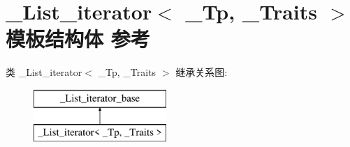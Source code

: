 \hypertarget{struct___list__iterator}{}\section{\+\_\+\+List\+\_\+iterator$<$ \+\_\+\+Tp, \+\_\+\+Traits $>$ 模板结构体 参考}
\label{struct___list__iterator}
类 \+\_\+\+List\+\_\+iterator$<$ \+\_\+\+Tp, \+\_\+\+Traits $>$ 继承关系图\+:\begin{figure}[H]
\begin{center}
\leavevmode
\includegraphics[height=2.000000cm]{struct___list__iterator}
\end{center}
\end{figure}
